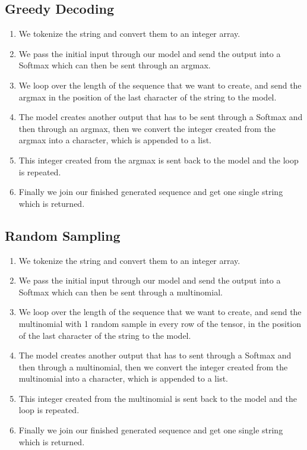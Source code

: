 \documentclass{article}
\begin{document}
\subsection{Greedy Decoding}
\begin{enumerate}
    \item We tokenize the string and convert them to an integer array.
    \item We pass the initial input through our model and send the output into a Softmax which can then be sent through an argmax.
    \item We loop over the length of the sequence that we want to create, and send the argmax in the position of the last character of the string to the model.
    \item The model creates another output that has to be sent through a Softmax and then through an argmax, then we convert the integer created from the argmax into a character, which is appended to a list.
    \item This integer created from the argmax is sent back to the model and the loop is repeated.
    \item Finally we join our finished generated sequence and get one single string which is returned.
\end{enumerate}
\subsection{Random Sampling}
\begin{enumerate}
    \item We tokenize the string and convert them to an integer array.
    \item We pass the initial input through our model and send the output into a Softmax which can then be sent through a multinomial.
    \item We loop over the length of the sequence that we want to create, and send the multinomial with 1 random sample in every row of the tensor, in the position of the last character of the string to the model.
    \item The model creates another output that has to sent through a Softmax and then through a multinomial, then we convert the integer created from the multinomial into a character, which is appended to a list.
    \item This integer created from the multinomial is sent back to the model and the loop is repeated.
    \item Finally we join our finished generated sequence and get one single string which is returned.
\end{enumerate}
\clearpage
\end{document}
